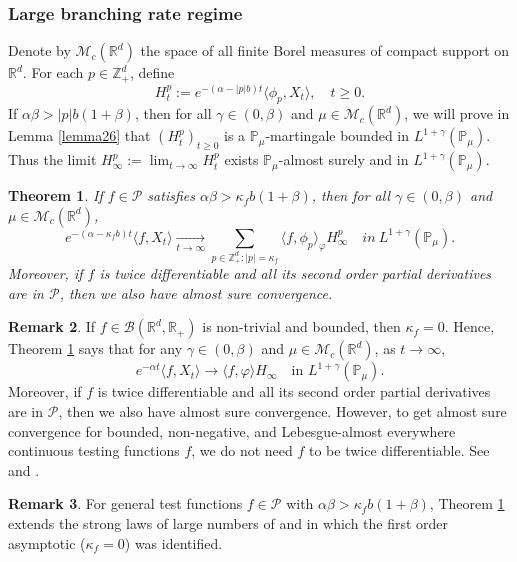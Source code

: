 \documentclass[12pt,a4paper]{amsart}
\theoremstyle{plain}
\newtheorem{thm}{Theorem}[section]
\theoremstyle{definition}
\newtheorem{rem}[thm]{Remark}
\numberwithin{equation}{section}
\begin{document}
\subsubsection{Large branching rate regime}
    Denote by $\mathcal M_c(\mathbb R^d)$ the space of all finite Borel measures of compact support on $\mathbb R^d$.
    For each $p\in \mathbb{Z}_+^d$, define
\[
    H_t^p
    := e^{-(\alpha-|p|b)t}\langle\phi_p,X_t\rangle,
    \quad t\geq 0.
\]
    If $\alpha\beta>|p|b(1+\beta)$, then for all $\gamma\in (0, \beta)$ and $\mu\in \mathcal M_c(\mathbb R^d)$,
      we will prove in Lemma \ref{lemma26} that $(H_t^p)_{t\geq 0}$ is a $\mathbb{P}_{\mu}$-martingale bounded in $L^{1+\gamma}(\mathbb{P}_{\mu})$.
    Thus the limit $H^p_{\infty}:=\lim_{t\rightarrow \infty}H_t^p$ exists $\mathbb{P}_{\mu}$-almost surely and in $L^{1+\gamma}(\mathbb{P}_{\mu})$.
 \begin{thm}
 \label{thm: law of large number}
     If $f \in \mathcal{P}$ satisfies $\alpha\beta>\kappa_fb(1+\beta)$, then
   for all
     $\gamma\in (0, \beta)$ and  $\mu\in \mathcal M_c(\mathbb R^d)$,
\[
    e^{-(\alpha-\kappa_fb)t}\langle f, X_t\rangle
       \xrightarrow[t\to \infty]{}\sum_{p\in \mathbb Z_+^d:|p|=\kappa_f}\langle f, \phi_p\rangle_{\varphi} H_{\infty}^p
    \quad in~ L^{1+\gamma}(\mathbb{P}_{\mu}).
\]
    Moreover, if $f$ is twice differentiable and all its second order partial derivatives are in $\mathcal{P}$, then we also have almost sure convergence.
\end{thm}
\begin{rem}
   If $f\in \mathcal B(\mathbb R^d, \mathbb R_+)$ is non-trivial and  bounded, then $\kappa_f=0$.
    Hence, Theorem \ref{thm: law of large number} says that
    for any $\gamma\in (0, \beta)$ and  $\mu\in \mathcal M_c(\mathbb R^d)$, as $t\rightarrow \infty$,
\[
    e^{-\alpha t}\langle f, X_t\rangle
    \rightarrow \langle f, \varphi\rangle H_{\infty}
    \quad \mbox{in } L^{1+\gamma}(\mathbb{P}_{\mu}).
\]
    Moreover, if $f$ is twice differentiable and all its second order partial derivatives are in $\mathcal{P}$, then we also have almost sure convergence.
    However, to get  almost sure convergence for bounded, non-negative, and Lebesgue-almost everywhere continuous testing functions $f$, we do not need $f$ to be twice differentiable. See \cite[Theorem 2.13 \& Example 8.1]{ChenRenYang2019Skeleton} and \cite[Theorem 1.2 \& Example 4.1]{EckhoffKyprianouWinkel2015Spines}.
\end{rem}
\begin{rem}
    For general test functions $f\in \mathcal{P}$ with $\alpha\beta>\kappa_fb(1+\beta)$, Theorem \ref{thm: law of large number} extends the strong laws of large numbers of \cite{ChenRenYang2019Skeleton} and \cite{EckhoffKyprianouWinkel2015Spines} in which the first order asymptotic ($\kappa_f=0$) was identified.
    \end{rem}
\end{document}
